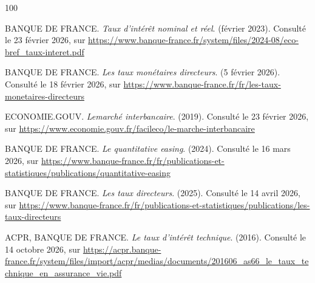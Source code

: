 \newpage %


\begin{thebibliography}{100}


BANQUE DE FRANCE. \textit{Taux d'intérêt nominal et réel}. (février 2023). Consulté le 23 février 2026, sur \url{https://www.banque-france.fr/system/files/2024-08/eco-bref_taux-interet.pdf}

BANQUE DE FRANCE. \textit{Les taux monétaires directeurs}. (5 février 2026). Consulté le 18 février 2026, sur \url{https://www.banque-france.fr/fr/les-taux-monetaires-directeurs}

ECONOMIE.GOUV. \textit{Lemarché interbancaire}. (2019). Consulté le 23 février 2026, sur \url{https://www.economie.gouv.fr/facileco/le-marche-interbancaire}

BANQUE DE FRANCE. \textit{Le quantitative easing}. (2024). Consulté le 16 mars 2026, sur \url{https://www.banque-france.fr/fr/publications-et-statistiques/publications/quantitative-easing}

BANQUE DE FRANCE. \textit{Les taux directeurs}. (2025). Consulté le 14 avril 2026, sur \url{https://www.banque-france.fr/fr/publications-et-statistiques/publications/les-taux-directeurs}


ACPR, BANQUE DE FRANCE. \textit{Le taux d'intérêt technique}. (2016). Consulté le 14 octobre 2026, sur \url{https://acpr.banque-france.fr/system/files/import/acpr/medias/documents/201606_as66_le_taux_technique_en_assurance_vie.pdf}


\end{thebibliography}
